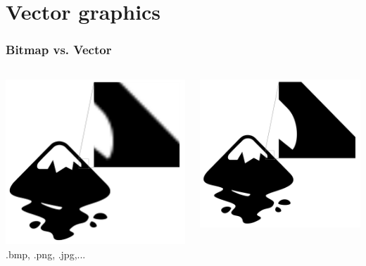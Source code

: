\documentclass[t]{beamer}
\begin{document}
	\frame{\titlepage}
	\section{Vector graphics}
	\begin{frame}
		\frametitle{Bitmap vs. Vector}
		\vspace{0.5cm}
		\begin{columns}
			\begin{column}[T]{0.5\textwidth}
				\includegraphics[width=\textwidth]{fig/logo_zoom_png}
				\vspace{0.5cm}
				.bmp, .png, .jpg,...
			\end{column}
			\begin{column}[T]{0.5\textwidth}
				\includegraphics[width=\textwidth]{fig/logo_zoom_pdf}

\end{column}
\end{columns}
\end{frame}
\end{document}
